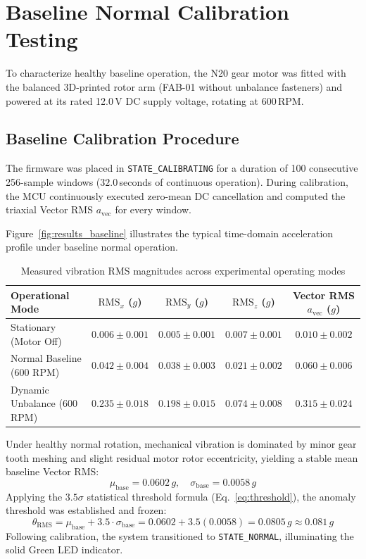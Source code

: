 \section{Baseline Normal Calibration Testing}
To characterize healthy baseline operation, the N20 gear motor was fitted with the balanced 3D-printed rotor arm (FAB-01 without unbalance fasteners) and powered at its rated 12.0\,V DC supply voltage, rotating at 600\,RPM.

\subsection{Baseline Calibration Procedure}
The firmware was placed in \texttt{STATE\_CALIBRATING} for a duration of 100 consecutive 256-sample windows ($32.0$\,seconds of continuous operation). During calibration, the MCU continuously executed zero-mean DC cancellation and computed the triaxial Vector RMS $a_{\mathrm{vec}}$ for every window.

Figure~\ref{fig:results_baseline} illustrates the typical time-domain acceleration profile under baseline normal operation.

\begin{table}[H]
\centering
\begin{tabular}{|l|c|c|c|c|}
\hline
\textbf{Operational Mode} & \textbf{$\mathrm{RMS}_x$ ($g$)} & \textbf{$\mathrm{RMS}_y$ ($g$)} & \textbf{$\mathrm{RMS}_z$ ($g$)} & \textbf{Vector RMS $a_{\mathrm{vec}}$ ($g$)} \\
\hline
Stationary (Motor Off) & $0.006 \pm 0.001$ & $0.005 \pm 0.001$ & $0.007 \pm 0.001$ & $0.010 \pm 0.002$ \\
Normal Baseline (600 RPM) & $0.042 \pm 0.004$ & $0.038 \pm 0.003$ & $0.021 \pm 0.002$ & \textbf{$0.060 \pm 0.006$} \\
Dynamic Unbalance (600 RPM) & $0.235 \pm 0.018$ & $0.198 \pm 0.015$ & $0.074 \pm 0.008$ & \textbf{$0.315 \pm 0.024$} \\
\hline
\end{tabular}
\caption{Measured vibration RMS magnitudes across experimental operating modes}
\label{tab:measured_rms}
\end{table}

Under healthy normal rotation, mechanical vibration is dominated by minor gear tooth meshing and slight residual motor rotor eccentricity, yielding a stable mean baseline Vector RMS:
\begin{equation}
\mu_{\mathrm{base}} = 0.0602\,g, \quad \sigma_{\mathrm{base}} = 0.0058\,g
\end{equation}
Applying the $3.5\sigma$ statistical threshold formula (Eq.~\ref{eq:threshold}), the anomaly threshold was established and frozen:
\begin{equation}
\theta_{\mathrm{RMS}} = \mu_{\mathrm{base}} + 3.5 \cdot \sigma_{\mathrm{base}} = 0.0602 + 3.5(0.0058) = 0.0805\,g \approx 0.081\,g
\end{equation}
Following calibration, the system transitioned to \texttt{STATE\_NORMAL}, illuminating the solid Green LED indicator.

